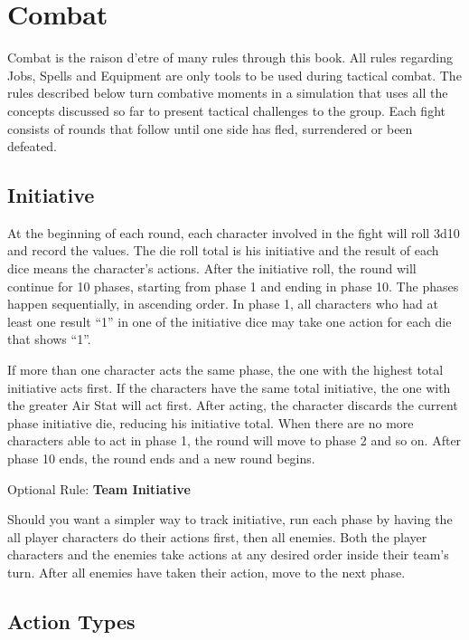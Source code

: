 \section{Combat}\label{sec:combat}
\begin{multicols}{2}
Combat is the raison d’etre of many rules through this book. All rules regarding Jobs, Spells and Equipment are only tools to be used during tactical combat. The rules described below turn combative moments in a simulation that uses all the concepts discussed so far to present tactical challenges to the group. Each fight consists of rounds that follow until one side has fled, surrendered or been defeated.

\subsection{Initiative}\label{subsec:init}
At the beginning of each round, each character involved in the fight will roll 3d10 and record the values. The die roll total is his initiative and the result of each dice means the character's actions. After the initiative roll, the round will continue for 10 phases, starting from phase 1 and ending in phase 10. The phases happen sequentially, in ascending order. In phase 1, all characters who had at least one result ``1'' in one of the initiative dice may take one action for each die that shows ``1''.

If more than one character acts the same phase, the one with the highest total initiative acts first. If the characters have the same total initiative, the one with the greater Air Stat will act first. After acting, the character discards the current phase initiative die, reducing his initiative total. When there are no more characters able to act in phase 1, the round will move to phase 2 and so on. After phase 10 ends, the round ends and a new round begins.

\begin{boco}
    Optional Rule: \textbf{Team Initiative}
    
    Should you want a simpler way to track initiative, run each phase by having the all player characters do their actions first, then all enemies. Both the player characters and the enemies take actions at any desired order inside their team's turn. After all enemies have taken their action, move to the next phase. 
    \end{boco}
    

\subsection{Action Types}\label{subsec:actions}

\end{multicols}
